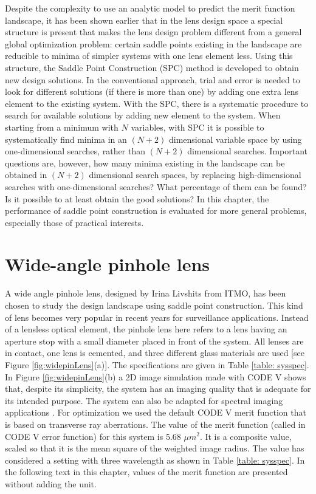 Despite the complexity to use an analytic model to predict the merit function landscape, it has been shown earlier \cite{BociortSPCSexplained}\cite{MVTurnhoutSPC15} that in the lens design space a special structure is present that makes the lens design problem different from a general global optimization problem: certain saddle points existing in the landscape are reducible to minima of simpler systems with one lens element less. Using this structure, the Saddle Point Construction (SPC) \cite{MVTurnhoutSPC15} method is developed to obtain new design solutions. In the conventional approach, trial and error is needed to look for different solutions (if there is more than one) by adding one extra lens element to the existing system. With the SPC, there is a systematic procedure to search for available solutions by adding new element to the system. When starting from a minimum with $N$ variables, with SPC it is possible to systematically find minima in an $(N+2)$ dimensional variable space by using one-dimensional searches, rather than $(N+2)$ dimensional searches. Important questions are, however, how many minima existing in the landscape can be obtained in $(N+2)$ dimensional search spaces, by replacing high-dimensional searches with one-dimensional searches? What percentage of them can be found? Is it possible to at least obtain the good solutions? In this chapter, the performance of saddle point construction is evaluated for more general problems, especially those of practical interests. 


\section{Wide-angle pinhole lens}

A wide angle pinhole lens, designed by Irina Livshits from ITMO, has been chosen to study the design landscape using saddle point construction. This kind of lens becomes very popular in recent years for surveillance applications. Instead of a lensless optical element, the pinhole lens here refers to a lens having an aperture stop with a small diameter placed in front of the system. All lenses are in contact, one lens is cemented, and three different glass materials are used [see Figure \ref{fig:widepinLens}(a)]. The specifications are given in Table \ref{table: sysspec}. In Figure \ref{fig:widepinLens}(b) a 2D image simulation made with CODE V shows that, despite its simplicity, the system has an imaging quality that is adequate for its intended purpose. The system can also be adapted for spectral imaging applications \cite{Strauch2015}. For optimization we used the default CODE V merit function that is based on transverse ray aberrations. The value of the merit function (called in CODE V error function) for this system is 5.68 $\mu m^2$. It is a composite value, scaled so that it is the mean square of the weighted image radius. The value has considered a setting with three wavelength as shown in Table \ref{table: sysspec}. In the following text in this chapter, values of the merit function are presented without adding the unit. 

